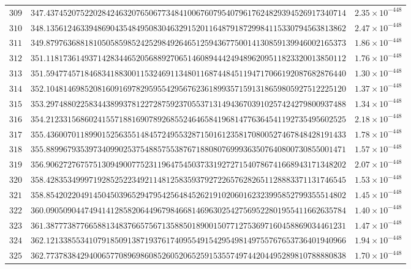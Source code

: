 \documentclass[12pt,reqno]{amsart}
\theoremstyle{remark}
\begin{document}
\begin{longtable}{clc}
$309$ & $347.4374520752202842463207650677348410067607954079617624829394526917340714$ & $2.35\times 10^{-448}$ \\
$310$ & $348.1356124633948690435484950830463291520116487918729984115330794563813862$ & $2.47\times 10^{-448}$ \\
$311$ & $349.8797636881810505859852425298492646512594367750014130859139946002165373$ & $1.86\times 10^{-448}$ \\
$312$ & $351.1181736149371428344652056889270651460894442494896209511823320013850112$ & $1.76\times 10^{-448}$ \\
$313$ & $351.5947745718468341883001153246911348011687448451194717066192087682876440$ & $1.30\times 10^{-448}$ \\
$314$ & $352.1048146985208160916978295955429567623618993571591318659805927512225120$ & $1.37\times 10^{-448}$ \\
$315$ & $353.2974880225834438993781227287592370553713149436703910257424279800937488$ & $1.34\times 10^{-448}$ \\
$316$ & $354.2123315686024155718816907892685524646584196814776364541192735495602525$ & $2.18\times 10^{-448}$ \\
$317$ & $355.4360070118990152563551484572495532871501612358170800527467848428191433$ & $1.78\times 10^{-448}$ \\
$318$ & $355.8899679353973409902537548857553876718808076999363507640800730855001471$ & $1.57\times 10^{-448}$ \\
$319$ & $356.9062727675751309490077523119647545037331927271540786741668943171348202$ & $2.07\times 10^{-448}$ \\
$320$ & $358.4283534999719285252234921148125835937927226576282651128883371131746545$ & $1.53\times 10^{-448}$ \\
$321$ & $358.8542022049145045039652947954256484526219102060162323995852799355514802$ & $1.45\times 10^{-448}$ \\
$322$ & $360.0905090447494141285820644967984668146963025427569522801955411662635784$ & $1.40\times 10^{-448}$ \\
$323$ & $361.3877738776658813483766575671358850189001507712753697160458869034461231$ & $1.47\times 10^{-448}$ \\
$324$ & $362.1213385534107918509138719376174095549154295498149755767653736401940966$ & $1.94\times 10^{-448}$ \\
$325$ & $362.7737838429400657708969860852605206525915355749744204495289810788880838$ & $1.70\times 10^{-448}$ \\

\end{longtable}
\end{document}
